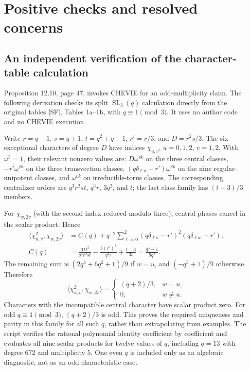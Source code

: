 \documentclass[10pt]{article}
\begin{document}
\section*{Positive checks and resolved concerns}
\subsection*{An independent verification of the character-table calculation}
Proposition 12.10, page 47, invokes CHEVIE for an odd-multiplicity claim. The following derivation checks its split \(\operatorname{SL}_3(q)\) calculation directly from the original tables [SF], Tables 1a–1b, with \(q\equiv1\pmod3\). It uses no author code and no CHEVIE execution.\par
Write \(r=q-1\), \(s=q+1\), \(t=q^2+q+1\), \(r'=r/3\), and \(D=r^2s/3\). The six exceptional characters of degree \(D\) have indices \(\chi_{u,v}\), \(u=0,1,2\), \(v=1,2\). With \(\omega^3=1\), their relevant nonzero values are: \(D\omega^{vk}\) on the three central classes, \(-r'\omega^{vk}\) on the three transvection classes, \((q\delta_{\ell u}-r')\omega^{vk}\) on the nine regular-unipotent classes, and \(\omega^{vk}\) on irreducible-torus classes. The corresponding centralizer orders are \(q^3r^2st\), \(q^3r\), \(3q^2\), and \(t\); the last class family has \((t-3)/3\) members.\par
For \(\chi_{w,2v}\) (with the second index reduced modulo three), central phases cancel in the scalar product. Hence \[\begin{aligned}
 \langle\chi_{u,v}^2,\chi_{w,2v}\rangle
 &=C(q)+q^{-2}\sum_{\ell=0}^2
 (q\delta_{\ell u}-r')^2(q\delta_{\ell w}-r'),\\
 C(q)&=\frac{3D^3}{q^3r^2st}
       -\frac{3(r')^3}{q^3r}
       +\frac{t-3}{3t}
       =\frac{q^3-1}{9q^2}.\end{aligned}\] The remaining sum is \((2q^3+6q^2+1)/9\) if \(w=u\), and \((-q^3+1)/9\) otherwise. Therefore \[\boxed{\ \langle\chi_{u,v}^2,\chi_{w,2v}\rangle
       =\begin{cases}(q+2)/3,&w=u,\\0,&w\ne u.\end{cases}\ }\] Characters with the incompatible central character have scalar product zero. For odd \(q\equiv1\pmod3\), \((q+2)/3\) is odd. This proves the required uniqueness and parity in this family for all such \(q\), rather than extrapolating from examples. The script verifies the rational polynomial identity coefficient by coefficient and evaluates all nine scalar products for twelve values of \(q\), including \(q=13\) with degree \(672\) and multiplicity \(5\). One even \(q\) is included only as an algebraic diagnostic, not as an odd-characteristic case.\par
\end{document}

